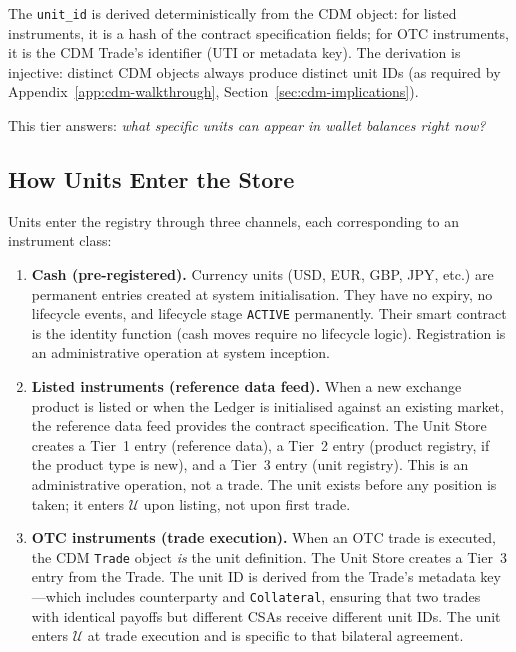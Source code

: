 \documentclass[11pt,a4paper]{article}
\begin{document}
The \texttt{unit\_id} is derived deterministically from the CDM object: for listed instruments, it is a hash of the contract specification fields; for OTC instruments, it is the CDM Trade's identifier (UTI or metadata key). The derivation is injective: distinct CDM objects always produce distinct unit IDs (as required by Appendix~\ref{app:cdm-walkthrough}, Section~\ref{sec:cdm-implications}).

This tier answers: \emph{what specific units can appear in wallet balances right now?}

\subsection{How Units Enter the Store}
\label{sec:unit-registration}

Units enter the registry through three channels, each corresponding to an instrument class:

\begin{enumerate}
\item \textbf{Cash (pre-registered).} Currency units (USD, EUR, GBP, JPY, etc.) are permanent entries created at system initialisation. They have no expiry, no lifecycle events, and lifecycle stage \texttt{ACTIVE} permanently. Their smart contract is the identity function (cash moves require no lifecycle logic). Registration is an administrative operation at system inception.

\item \textbf{Listed instruments (reference data feed).} When a new exchange product is listed or when the Ledger is initialised against an existing market, the reference data feed provides the contract specification. The Unit Store creates a Tier~1 entry (reference data), a Tier~2 entry (product registry, if the product type is new), and a Tier~3 entry (unit registry). This is an administrative operation, not a trade. The unit exists before any position is taken; it enters $\mathcal{U}$ upon listing, not upon first trade.

\item \textbf{OTC instruments (trade execution).} When an OTC trade is executed, the CDM \texttt{Trade} object \emph{is} the unit definition. The Unit Store creates a Tier~3 entry from the Trade. The unit ID is derived from the Trade's metadata key---which includes counterparty and \texttt{Collateral}, ensuring that two trades with identical payoffs but different CSAs receive different unit IDs. The unit enters $\mathcal{U}$ at trade execution and is specific to that bilateral agreement.
\end{enumerate}
\end{document}
